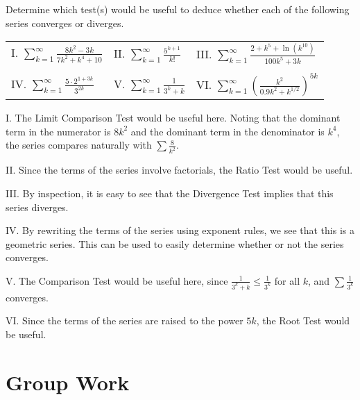 \documentclass[]{ximera}
\begin{document}
\begin{problem}
Determine which test(s) would be useful to deduce whether each of the following series converges or diverges.
\begin{center}
\begin{tabular}{lll}
I. $\sum_{k=1}^\infty \frac{8k^2-3k}{7k^2+k^4+10}$ \hspace{.2in} & II. $\sum_{k=1}^\infty \frac{5^{k+1}}{k!}$ \hspace{.2in} & III. $\sum_{k=1}^\infty \frac{2+k^5+\ln(k^{10})}{100k^5+3k}$ \\
&& \\
IV. $\sum_{k=1}^\infty \frac{5\cdot 2^{1+3k}}{3^{2k}}$ \hspace{.2in} & V. $\sum_{k=1}^\infty \frac{1}{3^k + k}$ \hspace{.2in} & VI. $\sum_{k=1}^\infty \left(\frac{k^2}{0.9k^2+k^{1/2}}\right)^{5k}$
\end{tabular}
\end{center}
\begin{solution}
I. The Limit Comparison Test would be useful here. Noting that the dominant term in the numerator is $8k^2$ and the dominant term in the denominator is $k^4$, the series compares naturally with $\sum \frac{8}{k^2}$.

II. Since the terms of the series involve factorials, the Ratio Test would be useful.

III. By inspection, it is easy to see that the Divergence Test implies that this series diverges.

IV. By rewriting the terms of the series using exponent rules, we see that this is a geometric series. This can be used to easily determine whether or not the series converges.

V. The Comparison Test would be useful here, since $\frac{1}{3^k + k} \leq \frac{1}{3^k}$ for all $k$, and $\sum \frac{1}{3^k}$ converges.

VI. Since the terms of the series are raised to the power $5k$, the Root Test would be useful.
\end{solution}
\end{problem}

\section{Group Work}
\end{document}
